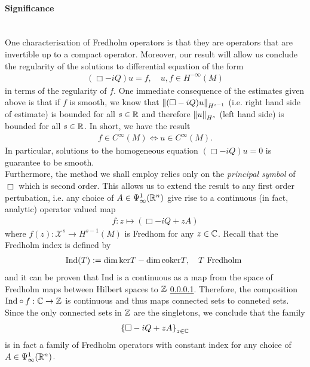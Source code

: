 \documentclass[12pt]{article}
\begin{document}
\paragraph{Significance} \hfill \\
One characterisation of Fredholm operators is that they are operators that are invertible up to a compact operator. Moreover, our result will allow us conclude the regularity of the solutions to differential equation of the form 
\begin{align*}
(\Box - iQ) u = f, \quad u, f \in H^{-\infty}(M)
\end{align*}
in terms of the regularity of $f$. One immediate consequence of the estimates given above is that if $f$ is smooth, we know that $\norm[(\Box - iQ)u ]_{H^{s-1}}$ (i.e. right hand side of estimate) is bounded for all $s \in \R$ and therefore $\norm[u]_{H^s}$ (left hand side) is bounded for all $s \in \R$. In short, we have the result 
\begin{align*}
f \in C^\infty(M) \iff u \in C^\infty(M). 
\end{align*}
In particular, solutions to the homogeneous equation $(\Box - iQ)u = 0$ is guarantee to be smooth. \\


Furthermore, the method we shall employ relies only on the \emph{principal symbol} of $\Box$ which is second order. This allows us to extend the result to any first order pertubation, i.e. any choice of $A \in \Psi^{1}_{\infty}(\R^n)$ give rise to a continuous (in fact, analytic) operator valued map 
\begin{align*}
f : z \mapsto (\Box - iQ + zA)
\end{align*}
where $f(z) : \mathcal{X}^s \to H^{s - 1}(M)$ is Fredhom for any $z \in \C$. Recall that the Fredholm index is defined by
\begin{align*}
\mathrm{Ind}(T) := \dim \ker T - \dim \coker T, \quad T \text{ Fredholm }
\end{align*}
and it can be proven that $\mathrm{Ind}$ is a continuous as a map from the space of Fredholm maps between Hilbert spaces to $\Z$ \ref{}. Therefore, the composition $\mathrm{Ind} \circ f : \C \to \Z$ is continuous and thus maps connected sets to conneted sets. Since the only connected sets in $\Z$ are the singletons, we conclude that the family
\begin{align*}
\set{\Box - iQ + zA}_{z \in \C} 
\end{align*}
is in fact a family of Fredholm operators with constant index for any choice of $A \in \Psi^{1}_{\infty}(\R^n)$.
\end{document}
